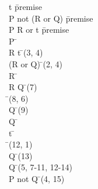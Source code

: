 \documentclass{article}
\begin{document}
\begin{proofbox}
\: \lnot t \= \hbox{premise} \\
\: P \rightarrow not (R or Q) \= \hbox{premise} \\
\: P \rightarrow R or t \= \hbox{premise} \\
\open
\: P \= \asm \\
\: R \lor t \= \implieselim(3, 4) \\
\: \lnot (R or Q) \= \implieselim(2, 4) \\
\openAlt
\: R \= \asm \\
\: R \lor Q \= \orintro(7) \\
\: \bot \= \bottomintro(8, 6) \\
\: \lnot Q \= \bottomelim(9) \\
\: \lnot Q \=  \\
\splitAlt
\: t \= \asm \\
\: \bot \= \bottomintro(12, 1) \\
\: \lnot Q \= \bottomelim(13) \\
\closeAlt
\: \lnot Q \= \orelim(5, 7-11, 12-14) \\
\close
\: P \rightarrow not Q \= \impliesintro(4, 15) \\
\end{proofbox}
\end{document}

